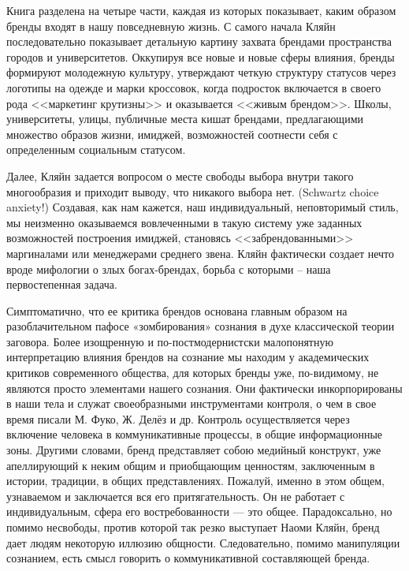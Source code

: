 Книга разделена на четыре части, каждая из которых показывает, каким образом бренды входят в нашу
повседневную жизнь. С самого начала Кляйн последовательно показывает детальную картину захвата
брендами пространства городов и университетов. Оккупируя все новые и новые сферы влияния, бренды
формируют молодежную культуру, утверждают четкую структуру статусов через логотипы на одежде и марки
кроссовок, когда подросток включается в своего рода <<маркетинг крутизны>> и оказывается <<живым
брендом>>. Школы, университеты, улицы, публичные места кишат брендами, предлагающими множество
образов жизни, имиджей, возможностей соотнести себя с определенным социальным статусом.

Далее, Кляйн задается вопросом о месте свободы выбора внутри такого многообразия и приходит выводу,
что никакого выбора нет. (Schwartz choice anxiety!) Создавая, как нам кажется, наш индивидуальный,
неповторимый стиль, мы неизменно оказываемся вовлеченными в такую систему уже заданных возможностей
построения имиджей, становясь <<забрендованными>> маргиналами или менеджерами среднего звена. Кляйн
фактически создает нечто вроде мифологии о злых богах-брендах, борьба с которыми -- наша
первостепенная задача.

Симптоматично, что ее критика брендов основана главным образом на разоблачительном пафосе
«зомбирования» сознания в духе классической теории заговора.\autocite{entin2000} Более изощренную и
по-постмодернистски малопонятную интерпретацию влияния брендов на сознание мы находим у
академических критиков современного общества, для которых бренды уже, по-видимому, не являются
просто элементами нашего сознания.  Они фактически инкорпорированы в наши тела и служат
своеобразными инструментами контроля, о чем в свое время писали М. Фуко, Ж. Делёз и др. Контроль
осуществляется через включение человека в коммуникативные процессы, в общие информационные
зоны. Другими словами, бренд представляет собою медийный конструкт, уже апеллирующий к неким общим и
приобщающим ценностям, заключенным в истории, традиции, в общих представлениях. Пожалуй, именно в
этом общем, узнаваемом и заключается вся его притягательность. Он не работает с индивидуальным,
сфера его востребованности — это общее. Парадоксально, но помимо несвободы, против которой так резко
выступает Наоми Кляйн, бренд дает людям некоторую иллюзию общности. Следовательно, помимо
манипуляции сознанием, есть смысл говорить о коммуникативной составляющей бренда.

